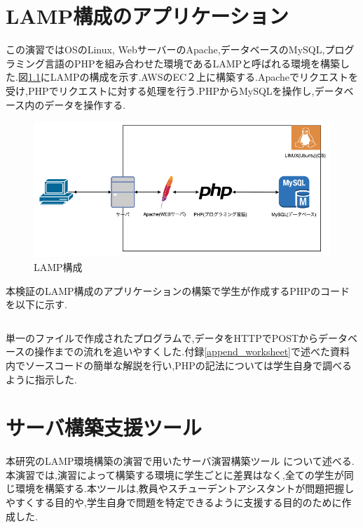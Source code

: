 \documentclass[11pt, a4paper]{jreport}
\begin{document}
\chapter{LAMP構成のアプリケーション}\label{append_lamp}
\renewcommand{\thepage}{B--\arabic{page}}

この演習ではOSのLinux, WebサーバーのApache,データベースのMySQL,プログラミング言語のPHPを組み合わせた環境であるLAMPと呼ばれる環境を構築した.図\ref{fig:lamp_kousei}にLAMPの構成を示す.AWSのEC２上に構築する.Apacheでリクエストを受け,PHPでリクエストに対する処理を行う.PHPからMySQLを操作し,データベース内のデータを操作する.

\begin{figure}[H]
\begin{center}
\includegraphics[width=120mm]{./img/lamp.png}
\caption{LAMP構成}
\label{fig:lamp_kousei}
\end{center}
\end{figure}

本検証のLAMP構成のアプリケーションの構築で学生が作成するPHPのコードを以下に示す.

\inputminted[breaklines,linenos,frame=lines,framesep=2mm]{php}{app.php}

単一のファイルで作成されたプログラムで,データをHTTPでPOSTからデータベースの操作までの流れを追いやすくした.付録\ref{append_worksheet}で述べた資料内でソースコードの簡単な解説を行い,PHPの記法については学生自身で調べるように指示した.

\chapter{サーバ構築支援ツール}\label{append_tool}
\renewcommand{\thepage}{C--\arabic{page}}

本研究のLAMP環境構築の演習で用いたサーバ演習構築ツール について述べる.本演習では,演習によって構築する環境に学生ごとに差異はなく,全ての学生が同じ環境を構築する.本ツールは,教員やスチューデントアシスタントが問題把握しやすくする目的や,学生自身で問題を特定できるように支援する目的のために作成した.
\end{document}
